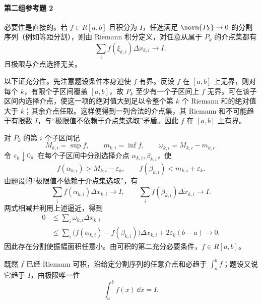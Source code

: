 \paragraph{第二组参考题 2}
\begin{xsolution}
必要性是直接的。若 $f\in R[a,b]$ 且积分为 $I$，任选满足 $\norm{P_k}\to0$ 的分割序列（例如等距分割），则由 Riemann 积分定义，对任意从属于 $P_k$ 的介点集都有
\[
  \sum_i f(\xi_{k,i})\Delta x_{k,i}\longrightarrow I,
\]
且极限与介点选择无关。

以下证充分性。先注意题设条件本身迫使 $f$ 有界。反设 $f$ 在 $[a,b]$ 上无界，则对每个 $k$，有限个子区间覆盖 $[a,b]$，故 $P_k$ 至少有一个子区间上 $f$ 无界。可在该子区间内选择介点，使这一项的绝对值大到足以令整个第 $k$ 个 Riemann 和的绝对值大于 $k$；其余介点任取。这样便得到一列合法的介点集，其 Riemann 和不可能趋于有限数 $I$，与“极限值不依赖于介点集选取”矛盾。因此 $f$ 在 $[a,b]$ 上有界。

对 $P_k$ 的第 $i$ 个子区间记
\[
  M_{k,i}=\sup f,
  \qquad
  m_{k,i}=\inf f,
  \qquad
  \omega_{k,i}=M_{k,i}-m_{k,i}.
\]
令 $\varepsilon_k\downarrow0$。在每个子区间中分别选择介点 $\alpha_{k,i},\beta_{k,i}$，使
\[
  f(\alpha_{k,i})>M_{k,i}-\varepsilon_k,
  \qquad
  f(\beta_{k,i})<m_{k,i}+\varepsilon_k.
\]
由题设的“极限值不依赖于介点集选取”，有
\[
  \sum_i f(\alpha_{k,i})\Delta x_{k,i}\to I,
  \qquad
  \sum_i f(\beta_{k,i})\Delta x_{k,i}\to I.
\]
两式相减并利用上述逼近，得到
\begin{align*}
  0&\leqslant\sum_i\omega_{k,i}\Delta x_{k,i}\\
  &\leqslant
  \sum_i\bigl(f(\alpha_{k,i})-f(\beta_{k,i})\bigr)\Delta x_{k,i}
  +2\varepsilon_k(b-a)\longrightarrow0.
\end{align*}
因此存在分割使振幅面积任意小。由可积的第二充分必要条件，$f\in R[a,b]$。

既然 $f$ 已经 Riemann 可积，沿给定分割序列的任意介点和必趋于 $\int_a^b f$；题设又说它趋于 $I$，由极限唯一性
\[
  \boxed{\int_a^b f(x)\,\dd x=I}.
\]
\end{xsolution}

